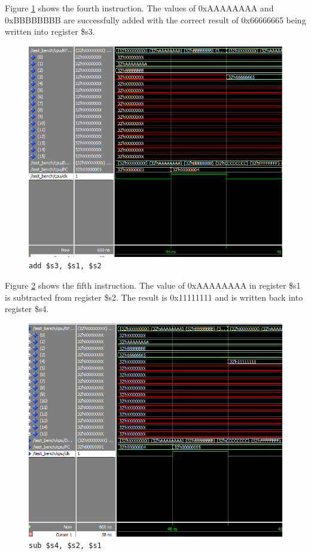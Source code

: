 \documentclass[12pt]{article}
\begin{document}
\clearpage
Figure \ref{fig:4-instr} shows the fourth instruction. The values of 0xAAAAAAAA and 0xBBBBBBBB are successfully added with the correct result of 0x66666665 being written into register \$s3.
\begin{figure}[h!]
\centering
\includegraphics[width=\linewidth]{simulation/4-instr}
\caption{\texttt{add \$s3, \$s1, \$s2}}
\label{fig:4-instr}
\end{figure}
\clearpage

 Figure \ref{fig:5-instr} shows the fifth instruction. The value of 0xAAAAAAAA in register \$s1 is subtracted from register \$s2. The result is 0x11111111 and is written back into register \$s4.
\begin{figure}[h!]
\centering
\includegraphics[width=\linewidth]{simulation/5-instr}
\caption{\texttt{sub \$s4, \$s2, \$s1}}
\label{fig:5-instr}
\end{figure}
\clearpage
\end{document}
